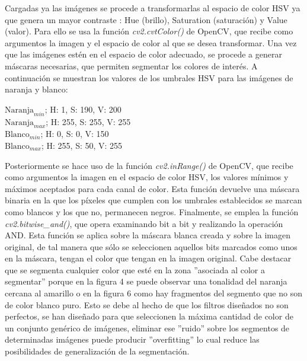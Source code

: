 \documentclass[a4paper,12pt]{article}
\begin{document}
{\vspace{0.5cm}

Cargadas ya las imágenes se procede a transformarlas al espacio de color HSV ya que genera un mayor contraste : Hue (brillo), Saturation (saturación) y Value (valor).
Para ello se usa la función \textit{cv2.cvtColor()} de OpenCV, que recibe como argumentos la imagen y el espacio de color al que se desea transformar. Una vez que las 
imágenes estén en el espacio de color adecuado, se procede a generar máscaras necesarias, que permiten segmentar los colores de interés. A continuación se muestran los
valores de los umbrales HSV para las imágenes de naranja y blanco:

\vspace{0.5cm}

{\centering
$\text{Naranja}_{min}$; H: 1, S: 190, V: 200 \\
$\text{Naranja}_{max}$; H: 255, S: 255, V: 255 \\
$\text{Blanco}_{min}$; H: 0, S: 0, V: 150 \\
$\text{Blanco}_{max}$; H: 255, S: 50, V: 255\\}

\vspace{0.5cm}

Posteriormente se hace uso de la función \textit{cv2.inRange()} de OpenCV, que recibe como argumentos la imagen en el espacio de color HSV, los valores mínimos y máximos 
aceptados para cada canal de color. Esta función devuelve una máscara binaria en la que los píxeles que cumplen con los umbrales establecidos se marcan como blancos y 
los que no, permanecen negros. Finalmente, se emplea la función \textit{cv2.bitwise\_and()}, que opera examinando bit a bit y realizando la operación AND. Esta función se aplica 
sobre la máscara blanca creada y sobre la imagen original, de tal manera que sólo se seleccionen aquellos bits marcados como unos en la máscara, tengan el color que tengan 
en la imagen original. Cabe destacar que se segmenta cualquier color que esté en la zona ''asociada al color a segmentar'' porque en la figura 4 se puede observar una tonalidad 
del naranja cercana al amarillo o en la figura 6 como hay fragmentos del segmento que no son de color blanco puro. Esto se debe al hecho de que los filtros diseñados no son perfectos,
se han diseñado para que seleccionen la máxima cantidad de color de un conjunto genérico de imágenes, eliminar ese ''ruido'' sobre los segmentos de determinadas imágenes puede 
producir ''overfitting'' lo cual reduce las posibilidades de generalización de la segmentación.

}
\end{document}
